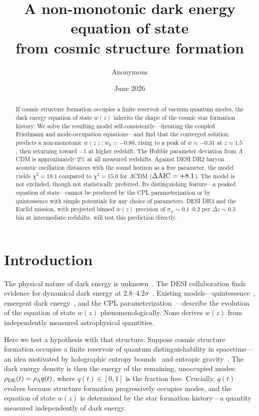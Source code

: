 \documentclass[12pt,a4paper]{article}
\begin{document}
\title{\bf A non-monotonic dark energy equation of state\\
from cosmic structure formation}

\author{Anonymous}
\date{June 2026}

\maketitle

\begin{abstract}
If cosmic structure formation occupies a finite reservoir of vacuum quantum modes, the dark energy equation of state $w(z)$ inherits the shape of the cosmic star formation history. We solve the resulting model self-consistently---iterating the coupled Friedmann and mode-occupation equations---and find that the converged solution predicts a non-monotonic $w(z)$: $w_0=-0.80$, rising to a peak of $w\approx-0.31$ at $z\approx1.5$, then returning toward $-1$ at higher redshift. The Hubble parameter deviation from $\Lambda$CDM is approximately $2\%$ at all measured redshifts. Against DESI DR2 baryon acoustic oscillation distances with the sound horizon as a free parameter, the model yields $\chi^2=19.1$ compared to $\chi^2=15.0$ for $\Lambda$CDM ($\Delta{\rm AIC}=+8.1$). The model is not excluded, though not statistically preferred. Its distinguishing feature---a peaked equation of state---cannot be produced by the CPL parameterization or by quintessence with simple potentials for any choice of parameters. DESI DR3 and the Euclid mission, with projected binned $w(z)$ precision of $\sigma_w\sim0.1$--$0.2$ per $\Delta z\sim0.3$ bin at intermediate redshifts, will test this prediction directly.
\end{abstract}

\section*{Introduction}

The physical nature of dark energy is unknown~\cite{riess1998,spergel2003}. The DESI collaboration finds evidence for dynamical dark energy at $2.8$--$4.2\sigma$~\cite{desi2025}. Existing models---quintessence~\cite{tsujikawa2013}, emergent dark energy~\cite{li2024}, and the CPL parameterization~\cite{chevallier2001}---describe the evolution of the equation of state $w(z)$ phenomenologically. None derives $w(z)$ from independently measured astrophysical quantities.

Here we test a hypothesis with that structure. Suppose cosmic structure formation occupies a finite reservoir of quantum distinguishability in spacetime---an idea motivated by holographic entropy bounds~\cite{thooft1993,susskind1995} and entropic gravity~\cite{verlinde2011,jacobson1995}. The dark energy density is then the energy of the remaining, unoccupied modes: $\rho_{\rm DE}(t)=\rho_\Lambda q(t)$, where $q(t)\in[0,1]$ is the fraction free. Crucially, $q(t)$ evolves because structure formation progressively occupies modes, and the equation of state $w(z)$ is determined by the star formation history---a quantity measured independently of dark energy.
\end{document}
